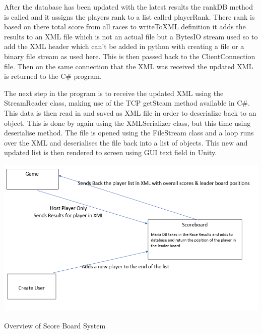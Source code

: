 After the database has been updated with the latest results the rankDB method is called and it assigns the players rank to a list called playerRank. There rank is based on there total score from all races to writeToXML  definition it adds the results to an XML file which is not an actual file but a BytesIO stream used so to add the XML header which can't be added in python with creating a file or a binary file stream as used here. This is then passed back to the ClientConnection file. Then on the same connection that the XML was received the updated XML is returned to the C# program.    
\newline

The next step in the program is to receive the updated XML using the StreamReader class, making use of the TCP getSteam method available in C#. This data is then read in and saved as XML file in order to deserialize back to an object. This is done by again using the XMLSerializer class, but this time using deserialise method. The file is opened using the FileStream class and a loop runs over the XML and deserialises the file back into a list of objects. This new and updated list is then rendered to screen using GUI text field in Unity.
\newline

\includegraphics[width=1\columnwidth]{img/scoreBoard.PNG}

Overview of Score Board System

\newpage
